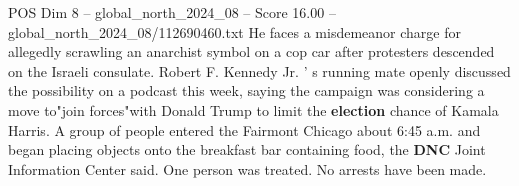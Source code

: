 \begin{textsample}{POS Dim 8 – global\_north\_2024\_08 – Score 16.00 – global\_north\_2024\_08/112690460.txt}
He faces a misdemeanor charge for allegedly scrawling an anarchist symbol on a cop car after protesters descended on the Israeli consulate.
Robert F.
Kennedy Jr. ' s running mate openly discussed the possibility on a podcast this week, saying the campaign was considering a move to"join forces"with Donald Trump to limit the \textbf{election} chance of Kamala Harris.
A group of people entered the Fairmont Chicago about 6:45 a.m. and began placing objects onto the breakfast bar containing food, the \textbf{DNC} Joint Information Center said.
One person was treated.
No arrests have been made.

\end{textsample}
